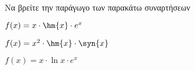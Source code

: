 Να βρείτε την παράγωγο των παρακάτω συναρτήσεων
\begin{alist}
\item $ f(x)=x\cdot\hm{x}\cdot e^x $
\item $ f(x)=x^2\cdot\hm{x}\cdot\syn{x} $
\item $ f(x)=x\cdot\ln{x}\cdot e^x $
\end{alist}
